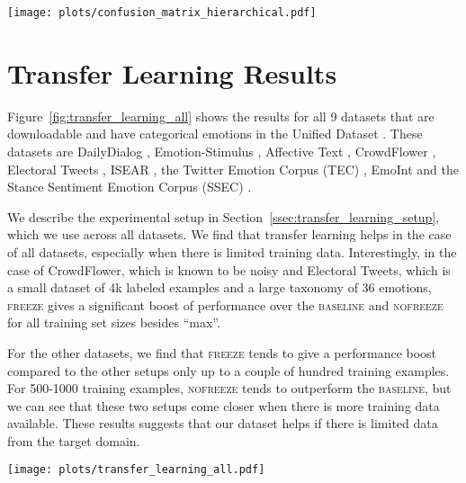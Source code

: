 \documentclass[11pt,a4paper]{article}
\begin{document}
\begin{figure*}[t!]
 \centering
   \centering
   \texttt{[image: plots/confusion\_matrix\_hierarchical.pdf]}
   \caption{A normalized confusion matrix for our model predictions. The plot shows that the model confuses emotions with other emotions that are related in intensity and sentiment.}
   \label{fig:confusion_matrix}
\end{figure*}

\section{Transfer Learning Results}
\label{sec:appendix_transfer_learning}

Figure~\ref{fig:transfer_learning_all} shows the results for all 9 datasets that are downloadable and have categorical emotions in the Unified Dataset \citep{unified-klinger2018analysis}. These datasets are DailyDialog \citep{li2017dailydialog}, Emotion-Stimulus \citep{ghazi2015detecting}, Affective Text \citep{affective-text-2007-semeval}, CrowdFlower \citep{crowdflower-2016}, Electoral Tweets \citep{electoraltweets-mohammad2015sentiment}, ISEAR \citep{scherer1994evidence}, the Twitter Emotion Corpus (TEC) \citep{tec-mohammad2012emotional}, EmoInt \citep{mohammad-etal-2018-semeval} and the Stance Sentiment Emotion Corpus (SSEC) \citep{schuff2017annotation}. 

We describe the experimental setup in Section~\ref{ssec:transfer_learning_setup}, which we use across all datasets. We find that transfer learning helps in the case of all datasets, especially when there is limited training data. Interestingly, in the case of CrowdFlower, which is known to be noisy \citep{unified-klinger2018analysis} and Electoral Tweets, which is a small dataset of 4k labeled examples and a large taxonomy of 36 emotions, \textsc{freeze} gives a significant boost of performance over the \textsc{baseline} and \textsc{nofreeze} for all training set sizes besides ``max''. 

For the other datasets, we find that \textsc{freeze} tends to give a performance boost compared to the other setups only up to a couple of hundred training examples. For 500-1000 training examples, \textsc{nofreeze} tends to outperform the \textsc{baseline}, but we can see that these two setups come closer when there is more training data available. These results suggests that our dataset helps if there is limited data from the target domain.



\begin{figure*}[t!]
 \centering
   \centering
   \texttt{[image: plots/transfer\_learning\_all.pdf]}
   \caption{Transfer learning results on 9 emotion benchmarks from the Unified Dataset \citep{unified-klinger2018analysis}.}
   \label{fig:transfer_learning_all}
\end{figure*}

 
\end{document}
